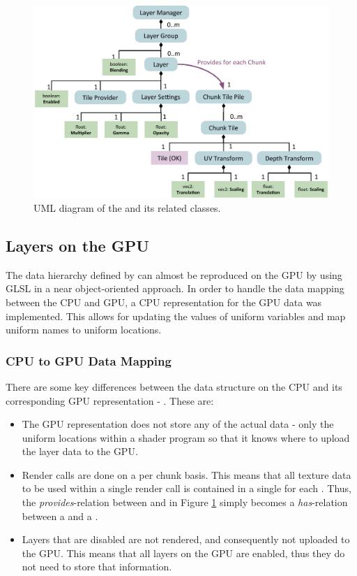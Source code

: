 \begin{figure}[htbp]
    \centering
    \includegraphics[width=\textwidth]{figures/implementation/layers/layermanager.pdf}
    \caption{UML diagram of the  and its related classes.}
    \label{fig:layermanager}
\end{figure}

\subsection{Layers on the GPU}

The data hierarchy defined by  can almost be reproduced on the GPU by using GLSL in a near object-oriented approach. In order to handle the data mapping between the CPU and GPU, a CPU representation for the GPU data was implemented. This allows for updating the values of uniform variables and map uniform names to uniform locations.

\subsubsection{CPU to GPU Data Mapping}

There are some key differences between the  data structure on the CPU and its corresponding GPU  representation - . These are:

\begin{itemize}
\item The GPU representation does not store any of the actual  data - only the uniform locations within a shader program so that it knows where to upload the layer data to the GPU. 
\item Render calls are done on a per chunk basis. This means that all texture data to be used within a single render call is contained in a single  for each . Thus, the \emph{provides}-relation between  and  in Figure \ref{fig:layermanager} simply becomes a \emph{has}-relation between a  and a .
\item Layers that are disabled are not rendered, and consequently not uploaded to the GPU. This means that all layers on the GPU are enabled, thus they do not need to store that information.
\end{itemize}

